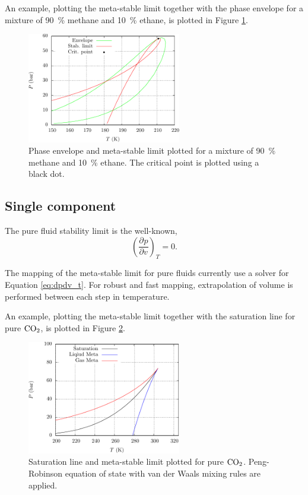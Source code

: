 \documentclass[internal,english]{sintefmemo2012}
\newcommand*{\pd}[3][]{\frac{\partial^{#1}#2}{\partial{#3}^{#1}}}%
\newcommand{\coto}{\ensuremath{\text{CO}_{\text{\scriptsize 2}}}}
\begin{document}
An example, plotting the meta-stable limit together with the phase
envelope for a mixture of \SI{90}{\percent} methane and
\SI{10}{\percent} ethane, is plotted in Figure \ref{fig:meta}.
\begin{figure}[h]
  \centering
  \includegraphics[width=0.6\textwidth]{meta}
  \caption{Phase envelope and meta-stable limit plotted for a mixture
    of \SI{90}{\percent} methane and \SI{10}{\percent} ethane. The
    critical point is plotted using a black dot.}
  \label{fig:meta}
\end{figure}


\subsection{Single component}
The pure fluid stability limit is the well-known,
\begin{equation}
  \label{eq:dpdv_t}
  \left(\pd{p}{v}\right)_T = 0.
\end{equation}

The mapping of the meta-stable limit for pure fluids currently use a
solver for Equation \ref{eq:dpdv_t}. For robust and fast mapping,
extrapolation of volume is performed between each step in temperature.


An example, plotting the meta-stable limit together with the
saturation line for pure \coto, is plotted in Figure
\ref{fig:singleMeta}.
\begin{figure}[h]
  \centering
  \includegraphics[width=0.6\textwidth]{singleMeta}
  \caption{Saturation line and meta-stable limit plotted for pure
    \coto. Peng-Robinson equation of state with van der Waals mixing
    rules are applied.}
  \label{fig:singleMeta}
\end{figure}
\end{document}
